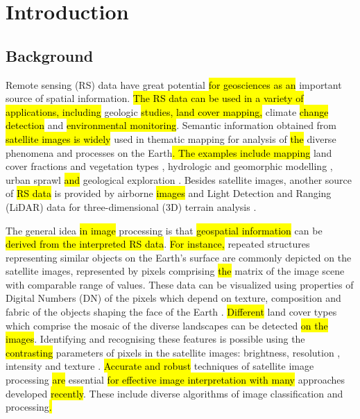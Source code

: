 \documentclass[jimaging,article,submit,pdftex,moreauthors]{Definitions/mdpi}
\begin{document}
\section{Introduction}

\subsection{Background}

Remote sensing (RS) data have great potential \hl{for geosciences as an} important source of spatial information. \hl{The RS data can be used in a variety of applications, including} geologic \hl{studies, land cover mapping,} climate \hl{change detection} and \hl{environmental monitoring}. Semantic information obtained from \hl{satellite images is widely} used in thematic mapping for analysis of \hl{the} diverse phenomena and processes on the Earth\hl{. The examples include mapping} land cover fractions \cite{COULIBALY2021108092} and vegetation types \cite{7729337,Lemenkova2020d,6946534,Lemenkova202019,6352694}, hydrologic and geomorphic modelling \cite{2015hydrologie},\hl{ }urban sprawl \hl{and} geological exploration\hl{ }\cite{1457509,NGOM2022102873}. Besides satellite images, another source of \hl{RS data }is provided by airborne \hl{images} \cite{JESSELL2015440,SIAGNE2022104680} and Light Detection and Ranging (LiDAR) data for three-dimensional (3D) terrain analysis \cite{SHARMA2021317,8978301,9213897,YEH2017236,9553919,LI201955,GUPTA2022100817}. 

The general idea \hl{in image} processing is that\hl{ geospatial information} can be \hl{derived from the interpreted RS data}. \hl{For instance, }repeated structures representing similar objects on the Earth's surface are commonly depicted on the satellite images, represented by pixels comprising \hl{the} matrix of the image scene with comparable range of values. These data can be\hl{ }visualized using properties of Digital Numbers (DN) of the pixels which depend on texture, composition and fabric of the objects shaping the face of the Earth \cite{YUAN2022106966}.\hl{ Different} land cover types which comprise the mosaic of the diverse landscapes can be detected \hl{on the images}. Identifying and recognising these features is possible using the \hl{contrasting }parameters of pixels in the satellite images: brightness, resolution \cite{4426419,322052,5446016}, intensity \cite{4761020,8519176} and texture \cite{995559,899813,8868688}. \hl{Accurate and robust }techniques\hl{ }of satellite image processing \hl{are} essential \hl{for effective image interpretation with many} approaches\hl{ }developed \hl{recently}. These include\hl{ }diverse algorithms of image classification and processing\hl{.} 
\end{document}

